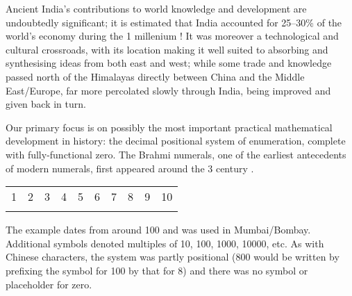 Ancient India's contributions to world knowledge and development are undoubtedly significant; it is estimated that India accounted for 25--30\% of the world's economy during the 1\st{} millenium \!\AD\!! It was moreover a technological and cultural crossroads, with its location making it well suited to absorbing and synthesising ideas from both east and west; while some trade and knowledge passed north of the Himalayas directly between China and the Middle East/Europe, far more percolated slowly through India, being improved and given back in turn.


% 
% 
% 
% 
% 


Our primary focus is on possibly the most important practical mathematical development in history: the decimal positional system of enumeration, complete with fully-functional zero. The Brahmi numerals, one of the earliest antecedents of modern numerals, first appeared around the 3\rd{} century \BC{}.
\begin{center}
	\begin{tabular}{cccccccccc}
		1&2&3&4&5&6&7&8&9&10\\
		\IndiaBone&\IndiaBtwo&\IndiaBthree&\IndiaBfour&\IndiaBfive&\IndiaBsix&\IndiaBseven&\IndiaBeight&\IndiaBnine&\IndiaBten
	\end{tabular}
\end{center}
The example dates from around 100\BC{} and was used in Mumbai/Bombay. Additional symbols denoted multiples of 10, 100, 1000, 10000, etc. As with Chinese characters, the system was partly positional (800 would be written by prefixing the symbol for 100 by that for 8) and there was no symbol or placeholder for zero.
\goodbreak

